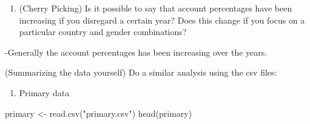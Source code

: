 \documentclass[
]{article}
\newenvironment{Shaded}{\begin{snugshade}}{\end{snugshade}}
\newcommand{\FunctionTok}[1]{\textcolor[rgb]{0.00,0.00,0.00}{#1}}
\newcommand{\NormalTok}[1]{#1}
\newcommand{\OtherTok}[1]{\textcolor[rgb]{0.56,0.35,0.01}{#1}}
\newcommand{\StringTok}[1]{\textcolor[rgb]{0.31,0.60,0.02}{#1}}
\providecommand{\tightlist}{%
  \setlength{\itemsep}{0pt}\setlength{\parskip}{0pt}}
\begin{document}
\begin{enumerate}
\def\labelenumi{\roman{enumi})}
\setcounter{enumi}{2}
\tightlist
\item
  (Cherry Picking) Is it possible to say that account percentages have
  been increasing if you disregard a certain year? Does this change if
  you focus on a particular country and gender combinations?
\end{enumerate}

-Generally the account percentages has been increasing over the years.

(Summarizing the data yourself) Do a similar analysis using the csv
files:

\begin{enumerate}
\def\labelenumi{\alph{enumi})}
\tightlist
\item
  Primary data
\end{enumerate}

\begin{Shaded}
\begin{Highlighting}[]
\NormalTok{primary }\OtherTok{\textless{}{-}} \FunctionTok{read.csv}\NormalTok{(}\StringTok{"primary.csv"}\NormalTok{)}
\FunctionTok{head}\NormalTok{(primary)}
\end{Highlighting}
\end{Shaded}
\end{document}
